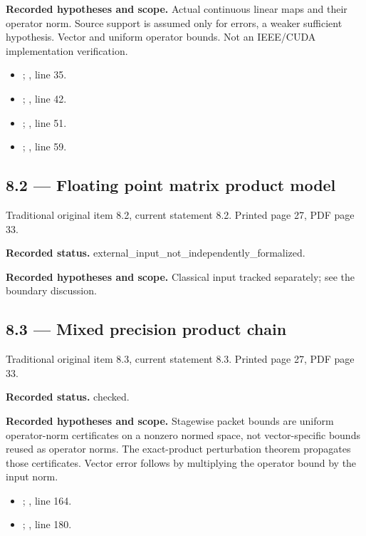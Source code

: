 \textbf{Recorded hypotheses and scope.} Actual continuous linear maps and their operator norm. Source support is assumed only for errors, a weaker sufficient hypothesis. Vector and uniform operator bounds. Not an IEEE/CUDA implementation verification.

\begin{itemize}
\item {}; , line 35.
\item {}; , line 42.
\item {}; , line 51.
\item {}; , line 59.
\end{itemize}
\subsection{8.2 — Floating point matrix product model}
\label{result:8.2}
{\footnotesize\color{muted}Traditional original item 8.2, current statement 8.2. Printed page 27, PDF page 33.}\par
\textbf{Recorded status.} external\_input\_not\_independently\_formalized.

\textbf{Recorded hypotheses and scope.} Classical input tracked separately; see the boundary discussion.

\subsection{8.3 — Mixed precision product chain}
\label{result:8.3}
{\footnotesize\color{muted}Traditional original item 8.3, current statement 8.3. Printed page 27, PDF page 33.}\par
\textbf{Recorded status.} checked.

\textbf{Recorded hypotheses and scope.} Stagewise packet bounds are uniform operator-norm certificates on a nonzero normed space, not vector-specific bounds reused as operator norms. The exact-product perturbation theorem propagates those certificates. Vector error follows by multiplying the operator bound by the input norm.

\begin{itemize}
\item {}; , line 164.
\item {}; , line 180.
\end{itemize}
